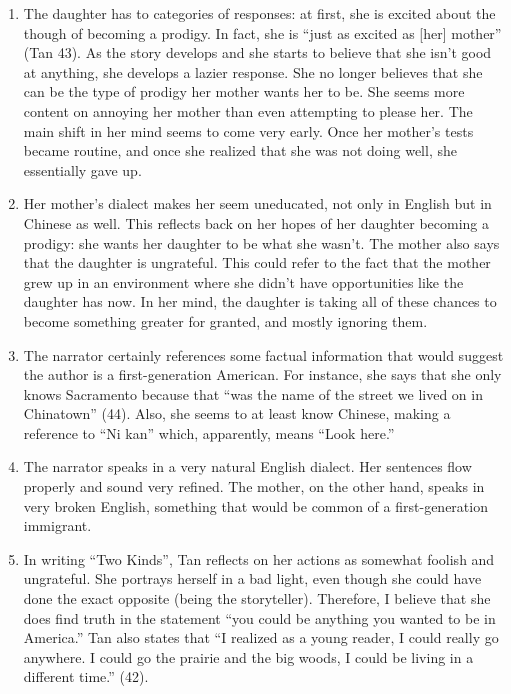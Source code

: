 \documentclass[12pt,letterpaper]{article}
\begin{document}
\begin{enumerate}

\item The daughter has to categories of responses: at first, she is excited
about the though of becoming a prodigy.  In fact, she is ``just as excited as
[her] mother'' (Tan 43).  As the story develops and she starts to believe that
she isn't good at anything, she develops a lazier response.  She no longer
believes that she can be the type of prodigy her mother wants her to be.  She
seems more content on annoying her mother than even attempting to please her.
The main shift in her mind seems to come very early.  Once her mother's tests
became routine, and once she realized that she was not doing well, she
essentially gave up.

\item Her mother's dialect makes her seem uneducated, not only in English but in
Chinese as well.  This reflects back on her hopes of her daughter becoming a
prodigy: she wants her daughter to be what she wasn't.  The mother also says
that the daughter is ungrateful.  This could refer to the fact that the mother
grew up in an environment where she didn't have opportunities like the daughter
has now.  In her mind, the daughter is taking all of these chances to become
something greater for granted, and mostly ignoring them.

\item  The narrator certainly references some factual information that would
suggest the author is a first-generation American.  For instance, she says that
she only knows Sacramento because that ``was the name of the street we lived on
in Chinatown'' (44).  Also, she seems to at least know Chinese, making a
reference to ``Ni kan'' which, apparently, means ``Look here.''

\item The narrator speaks in a very natural English dialect.  Her sentences flow
properly and sound very refined.  The mother, on the other hand, speaks in very
broken English, something that would be common of a first-generation immigrant.

\item In writing ``Two Kinds'', Tan reflects on her actions as somewhat foolish
and ungrateful.  She portrays herself in a bad light, even though she could have
done the exact opposite (being the storyteller).  Therefore, I believe that she
does find truth in the statement ``you could be anything you wanted to be in
America.''  Tan also states that ``I realized as a young reader, I could really
go anywhere.  I could go the prairie and the big woods, I could be living in a
different time.'' (42).

\end{enumerate}
\end{document}
